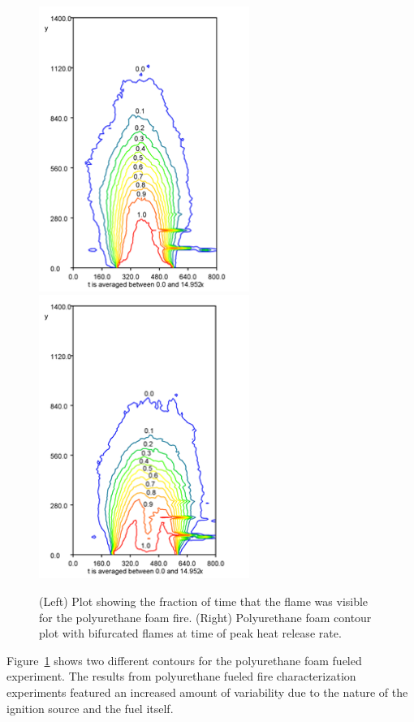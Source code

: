 \documentclass[twoside]{uocthesis}
\begin{document}
{\begin{figure}
  \includegraphics[width=2.7in]{../Figures/Fig22}
  \includegraphics[width=2.7in]{../Figures/Fig23} \\
  \caption[Visibility fractions for the polyurethane foam fire]{(Left) Plot showing the fraction of time that the flame was visible for the polyurethane foam fire. (Right) Polyurethane foam contour plot with bifurcated flames at time of peak heat release rate.}
  \label{Foam_Contours}
\end{figure}

Figure~\ref{Foam_Contours} shows two different contours for the polyurethane foam fueled experiment.  The results from polyurethane fueled fire characterization experiments featured an increased amount of variability due to the nature of the ignition source and the fuel itself.    

}
\end{document}

